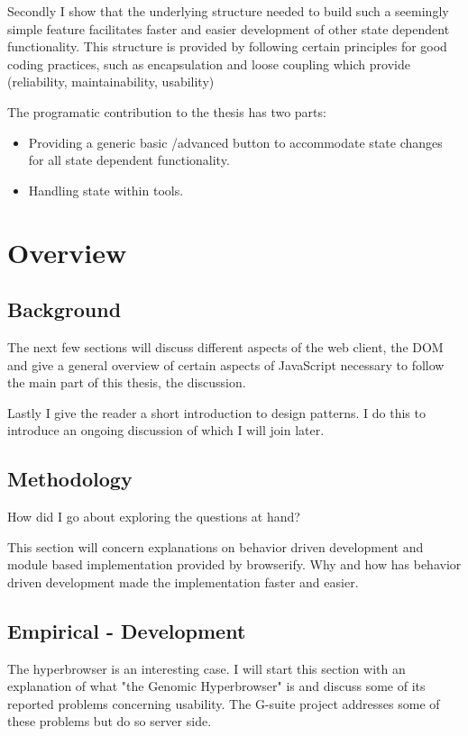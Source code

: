 \documentclass[english]{ifimaster}
\begin{document}
Secondly I show that the underlying structure needed to build such a seemingly simple feature facilitates faster and easier development of other state dependent functionality. This structure is provided by following certain principles for good coding practices, such as encapsulation and loose coupling which provide (reliability, maintainability, usability)

The programatic contribution to the thesis has two parts:
\begin{itemize}
  \item Providing a generic basic /advanced button to accommodate state changes for all state dependent functionality.
  \item Handling state within tools. 
\end{itemize}

\section{Overview}
\subsection{Background}


The next few sections will discuss different aspects of the web client, the DOM and give a general overview of certain aspects of JavaScript necessary to follow the main part of this thesis, the discussion. 

Lastly I give the reader a short introduction to design patterns. I do this to introduce an ongoing discussion of which I will join later.

\subsection{Methodology}
How did I go about exploring the questions at hand?


This section will concern explanations on behavior driven development and module based implementation provided by browserify. Why and how has behavior driven development made the implementation faster and easier.
\subsection{Empirical - Development}
The hyperbrowser is an interesting case.
I will start this section with an explanation of what "the Genomic Hyperbrowser" is and discuss some of its reported problems concerning usability. The G-suite project addresses some of these problems but do so server side. 
\end{document}
